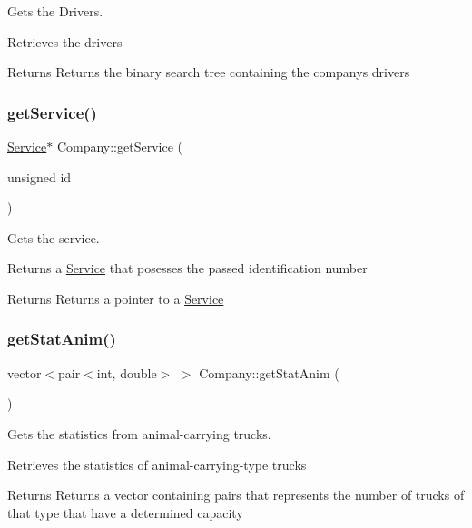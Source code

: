 Gets the Drivers. 

Retrieves the drivers

\begin{DoxyReturn}{Returns}
Returns the binary search tree containing the company\textquotesingle{}s drivers 
\end{DoxyReturn}
\mbox{\label{class_company_acf80072e8abec3e359387243d8cdc49f}} 
\subsubsection{\texorpdfstring{get\+Service()}{getService()}}
{\footnotesize\ttfamily \hyperlink{class_service}{Service}$\ast$ Company\+::get\+Service (\begin{DoxyParamCaption}\item[{unsigned}]{id }\end{DoxyParamCaption})}



Gets the service. 

Returns a \hyperlink{class_service}{Service} that posesses the passed identification number

\begin{DoxyReturn}{Returns}
Returns a pointer to a \hyperlink{class_service}{Service} 
\end{DoxyReturn}
\mbox{\label{class_company_af7e04162aac8a1057d2563e211e67460}} 
\subsubsection{\texorpdfstring{get\+Stat\+Anim()}{getStatAnim()}}
{\footnotesize\ttfamily vector$<$pair$<$int, double$>$ $>$ Company\+::get\+Stat\+Anim (\begin{DoxyParamCaption}{ }\end{DoxyParamCaption})\hspace{0.3cm}{\ttfamily [inline]}}



Gets the statistics from animal-\/carrying trucks. 

Retrieves the statistics of animal-\/carrying-\/type trucks

\begin{DoxyReturn}{Returns}
Returns a vector containing pairs that represents the number of trucks of that type that have a determined capacity 
\end{DoxyReturn}
\mbox{\label{class_company_a46ae11a39256db9dbf2941c58df579c5}} 
